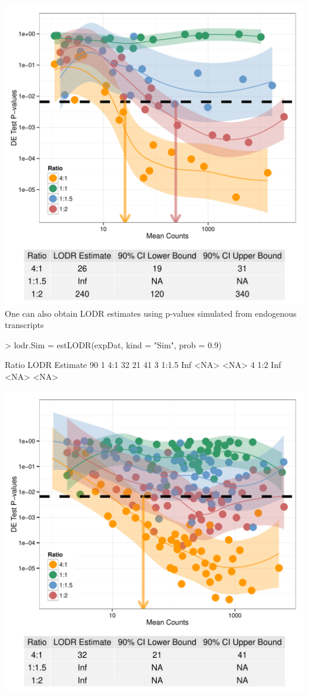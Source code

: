 \documentclass{article}
\begin{document}
\includegraphics{erccdashboardVignetteTry2-estLODRERCC}
One can also obtain LODR estimates using p-values simulated from endogenous transcripts
\begin{Schunk}
\begin{Sinput}
> lodr.Sim = estLODR(expDat, kind = "Sim", prob = 0.9)  
\end{Sinput}
\begin{Soutput}
  Ratio LODR Estimate 90%
1   4:1            32                 21                 41
3 1:1.5           Inf               <NA>               <NA>
4   1:2           Inf               <NA>               <NA>
\end{Soutput}
\end{Schunk}
\includegraphics{erccdashboardVignetteTry2-estLODRSim}
\end{document}
